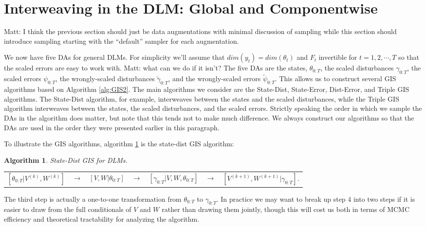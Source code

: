 \documentclass{article}
\newtheorem{alg}{Algorithm}
\newcommand{\matt}[1]{{\color{red} Matt: #1}}
\begin{document}
\section{Interweaving in the DLM: Global and Componentwise}\label{sec:DLMinter}
\matt{I think the previous section should just be data augmentations with minimal discussion of sampling while this section should introduce sampling starting with the ``default'' sampler for each augmentation.}

We now have five DAs for general DLMs. For simplicity we'll assume that $dim(y_t)=dim(\theta_t)$ and $F_t$ invertible for $t=1,2,\cdots,T$ so that the scaled errors are easy to work with. \matt{what can we do if it isn't?} The five DAs are the states, $\theta_{0:T}$, the scaled disturbances $\gamma_{0:T}$, the scaled errors $\psi_{0:T}$, the wrongly-scaled disturbances $\tilde{\gamma}_{0:T}$, and the wrongly-scaled errors $\tilde{\psi}_{0:T}$. This allows us to construct several GIS algorithms based on Algorithm \ref{alg:GIS2}. The main algorithms we consider are the State-Dist, State-Error, Dist-Error, and Triple GIS algorithms. The State-Dist algorithm, for example, interweaves between the states and the scaled disturbances, while the Triple GIS algorithm interweaves between the states, the scaled disturbances, and the scaled errors. Strictly speaking the order in which we sample the DAs in the algorithm does matter, but \citet{yu2011center} note that this tends not to make much difference. We always construct our algorithms so that the DAs are used in the order they were presented earlier in this paragraph.

To illustrate the GIS algorithms, algorithm \ref{alg:SDint} is the state-dist GIS algorithm:
\begin{alg}State-Dist GIS for DLMs.\label{alg:SDint}\\
  \begin{center}
    \begin{tabular}{lllllll}
      $[\theta_{0:T}|V^{(k)},W^{(k)}]$&$\to$&$ [V,W|\theta_{0:T}]$&$\to$&$ [\gamma_{0:T}|V,W,\theta_{0:T}]$&$ \to $&$[V^{(k+1)},W^{(k+1)}|\gamma_{0:T}]$.
    \end{tabular}
  \end{center}
\end{alg}
The third step is actually a one-to-one transformation from $\theta_{0:T}$ to $\gamma_{0:T}$.  In practice we may want to break up step 4 into two steps if it is easier to draw from the full conditionals of $V$ and $W$ rather than drawing them jointly, though this will cost us both in terms of MCMC efficiency and theoretical tractability for analyzing the algorithm. 
\end{document}
